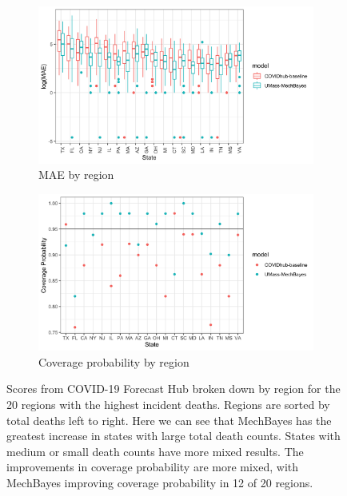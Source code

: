\documentclass[11pt]{amsart}
\begin{document}
\begin{figure}
  \centering

\begin{subfigure}{\textwidth}
  \centering
    \includegraphics[scale=.2]{mae_results_by_region_inc.png}
    \caption{MAE by region}
\end{subfigure}
\begin{subfigure}{\textwidth}
  \centering
    \includegraphics[scale=.20]{cp_results_by_location.png}
    \caption{Coverage probability by region}
\end{subfigure}
\caption{Scores from COVID-19 Forecast Hub broken down by region for the 20 regions with the highest incident deaths. Regions are sorted by total deaths left to right. Here we can see that MechBayes has the greatest increase in states with large total death counts. States with medium or small death counts have more mixed results. The improvements in coverage probability are more mixed, with MechBayes improving coverage probability in 12 of 20 regions. }
\label{fig:covidhub_region_results}
\end{figure}
\end{document}
